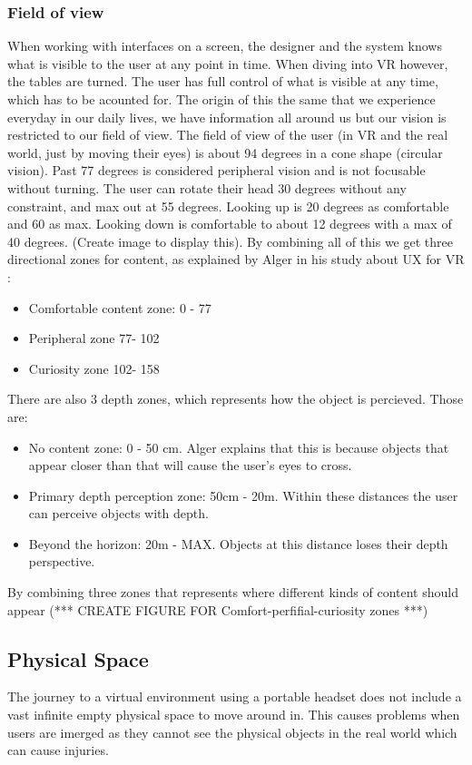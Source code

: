 \subsubsection{Field of view}
When working with interfaces on a screen, the designer and the system knows what is visible to the user at any point in time. When diving into VR however, the tables are turned. The user has full control of what is visible at any time, which has to be acounted for. The origin of this the same that we experience everyday in our daily lives, we have information all around us but our vision is restricted to our field of view. The field of view of the user (in VR and the real world, just by moving their eyes) is about 94 degrees in a cone shape (circular vision). Past 77 degrees is considered peripheral vision and is not focusable without turning. The user can rotate their head 30 degrees without any constraint, and max out at 55 degrees. Looking up is 20 degrees as comfortable and 60 as max. Looking down is comfortable to about 12 degrees with a max of 40 degrees. (Create image to display this). By combining all of this we get three directional zones for content, as explained by Alger in his study about UX for VR \cite{UX:Alger2015}:
\begin{itemize}
  \item Comfortable content zone: 0 - 77\degree
  \item Peripheral zone 77\degree - 102\degree
  \item Curiosity zone 102\degree - 158\degree
\end{itemize}
There are also 3 depth zones, which represents how the object is percieved. Those are:
\begin{itemize}
\item No content zone: 0 - 50 cm. Alger explains that this is because objects that appear closer than that will cause the user's eyes to cross.
\item Primary depth perception zone: 50cm - 20m. Within these distances the user can perceive objects with depth.
\item Beyond the horizon: 20m - MAX. Objects at this distance loses their depth perspective.
\end{itemize}
By combining three zones that represents where different kinds of content should appear (*** CREATE FIGURE FOR Comfort-perfifial-curiosity zones ***)
\subsection{Physical Space}
The journey to a virtual environment using a portable headset does not include a vast infinite empty physical space to move around in. This causes problems when users are imerged as they cannot see the physical objects in the real world which can cause injuries.
